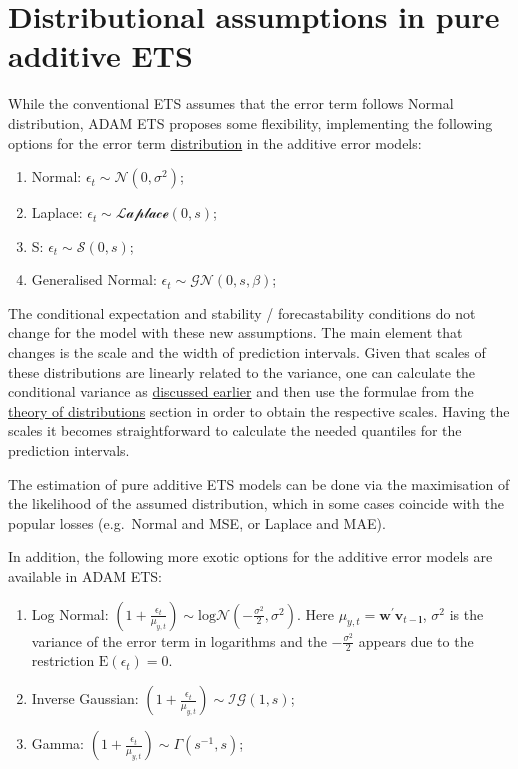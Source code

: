 \documentclass[
]{book}
\providecommand{\tightlist}{%
  \setlength{\itemsep}{0pt}\setlength{\parskip}{0pt}}
\theoremstyle{definition}
\theoremstyle{definition}
\theoremstyle{definition}
\theoremstyle{definition}
\theoremstyle{remark}
\begin{document}
\hypertarget{ADAMETSAdditiveDistributions}{%
\section{Distributional assumptions in pure additive ETS}\label{ADAMETSAdditiveDistributions}}

While the conventional ETS assumes that the error term follows Normal distribution, ADAM ETS proposes some flexibility, implementing the following options for the error term \protect\hyperlink{distributions}{distribution} in the additive error models:

\begin{enumerate}
\def\labelenumi{\arabic{enumi}.}
\tightlist
\item
  Normal: \(\epsilon_t \sim \mathcal{N}(0, \sigma^2)\);
\item
  Laplace: \(\epsilon_t \sim \mathcal{Laplace}(0, s)\);
\item
  S: \(\epsilon_t \sim \mathcal{S}(0, s)\);
\item
  Generalised Normal: \(\epsilon_t \sim \mathcal{GN}(0, s, \beta)\);
\end{enumerate}

The conditional expectation and stability / forecastability conditions do not change for the model with these new assumptions. The main element that changes is the scale and the width of prediction intervals. Given that scales of these distributions are linearly related to the variance, one can calculate the conditional variance as \protect\hyperlink{pureAdditiveExpectationAndVariance}{discussed earlier} and then use the formulae from the \protect\hyperlink{distributions}{theory of distributions} section in order to obtain the respective scales. Having the scales it becomes straightforward to calculate the needed quantiles for the prediction intervals.

The estimation of pure additive ETS models can be done via the maximisation of the likelihood of the assumed distribution, which in some cases coincide with the popular losses (e.g.~Normal and MSE, or Laplace and MAE).

In addition, the following more exotic options for the additive error models are available in ADAM ETS:

\begin{enumerate}
\def\labelenumi{\arabic{enumi}.}
\tightlist
\item
  Log Normal: \(\left(1+\frac{\epsilon_t}{\mu_{y,t}} \right) \sim \text{log}\mathcal{N}\left(-\frac{\sigma^2}{2}, \sigma^2\right)\).
  Here \(\mu_{y,t} = \mathbf{w}^\prime \mathbf{v}_{t-\boldsymbol{l}}\), \(\sigma^2\) is the variance of the error term in logarithms and the \(-\frac{\sigma^2}{2}\) appears due to the restriction \(\text{E}(\epsilon_t)=0\).
\item
  Inverse Gaussian: \(\left(1+\frac{\epsilon_t}{\mu_{y,t}} \right) \sim \mathcal{IG}(1, s)\);
\item
  Gamma: \(\left(1+\frac{\epsilon_t}{\mu_{y,t}} \right) \sim \mathcal{\Gamma}(s^{-1}, s)\);
\end{enumerate}
\end{document}
